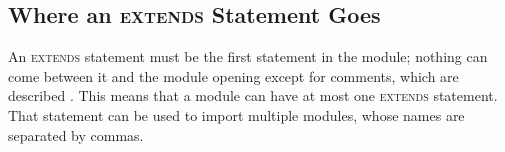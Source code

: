 \documentclass[fleqn,leqno]{article}
\begin{document}
  \vspace{-2.2\baselineskip}%
\subsection*{Where an {\rm\textsc{extends}} Statement Goes}

An \textsc{extends} statement must be the first statement in the
module; nothing can come between it and the module opening except for
comments, which are described .  This
means that a module can have at most one \textsc{extends} statement.
That statement can be used to import multiple modules, whose names are
separated by commas.
\end{document}
